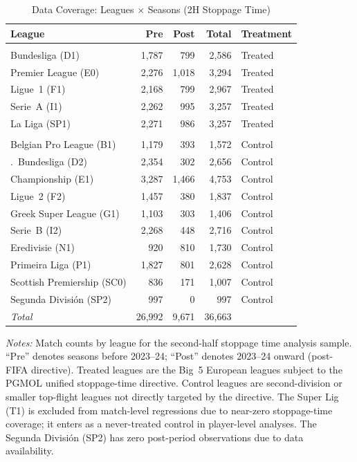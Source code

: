 \begin{table}[htbp]
\centering
\begin{threeparttable}
\caption{Data Coverage: Leagues $\times$ Seasons (2H Stoppage Time)}
\label{tab:coverage_matrix}
\small
\begin{tabular}{lrrrl}
\toprule
League & Pre & Post & Total & Treatment \\
\midrule
\addlinespace
\multicolumn{5}{l}{\textit{Treated (Big~5)}} \\
\addlinespace[3pt]
\quad Bundesliga (D1) & 1,787 & 799 & 2,586 & Treated \\
\quad Premier League (E0) & 2,276 & 1,018 & 3,294 & Treated \\
\quad Ligue~1 (F1) & 2,168 & 799 & 2,967 & Treated \\
\quad Serie~A (I1) & 2,262 & 995 & 3,257 & Treated \\
\quad La Liga (SP1) & 2,271 & 986 & 3,257 & Treated \\
\addlinespace
\multicolumn{5}{l}{\textit{Control}} \\
\addlinespace[3pt]
\quad Belgian Pro League (B1) & 1,179 & 393 & 1,572 & Control \\
\quad 2.\ Bundesliga (D2) & 2,354 & 302 & 2,656 & Control \\
\quad Championship (E1) & 3,287 & 1,466 & 4,753 & Control \\
\quad Ligue~2 (F2) & 1,457 & 380 & 1,837 & Control \\
\quad Greek Super League (G1) & 1,103 & 303 & 1,406 & Control \\
\quad Serie~B (I2) & 2,268 & 448 & 2,716 & Control \\
\quad Eredivisie (N1) & 920 & 810 & 1,730 & Control \\
\quad Primeira Liga (P1) & 1,827 & 801 & 2,628 & Control \\
\quad Scottish Premiership (SC0) & 836 & 171 & 1,007 & Control \\
\quad Segunda Divisi\'{o}n (SP2) & 997 & 0 & 997 & Control \\
\midrule
\textit{Total} & 26,992 & 9,671 & 36,663 & \\
\bottomrule
\end{tabular}
\begin{tablenotes}[flushleft]
\footnotesize
\item \textit{Notes:} Match counts by league for the second-half stoppage time
analysis sample. ``Pre'' denotes seasons before 2023--24; ``Post'' denotes
2023--24 onward (post-FIFA directive). Treated leagues are the Big~5 European
leagues subject to the PGMOL unified stoppage-time directive. Control leagues
are second-division or smaller top-flight leagues not directly targeted by the
directive. The Super Lig (T1) is excluded from match-level regressions due to
near-zero stoppage-time coverage; it enters as a never-treated control in
player-level analyses. The Segunda Divisi\'{o}n (SP2) has zero post-period
observations due to data availability.
\end{tablenotes}
\end{threeparttable}
\end{table}

